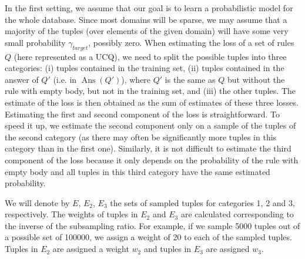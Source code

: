 \documentclass[akbc,twoside,11pt]{article}
\newcounter{example}
\newcommand{\ondrej}[1]{\textcolor{red}{O: {#1}}}
\begin{document}
In the first setting, we assume that our goal is to learn a probabilistic model for the whole database. Since most domains will be sparse, we may assume that a majority of the tuples (over elements of the given domain) will have some very small probability $\gamma_{\textit{target}}$, possibly zero. %
When estimating the loss of a set of rules $Q$ (here represented as a UCQ), we need to split the possible tuples into three categories: (i) tuples contained in the training set, (ii) tuples contained in the answer of $Q'$ (i.e. in $\operatorname{Ans}(Q')$), where $Q'$ is the same as $Q$ but without the rule with empty body, but not in the training set, and (iii) the other tuples. The estimate of the loss is then obtained as the sum of estimates of these three losses. Estimating the first and second component of the loss is straightforward. To speed it up, we estimate the second component only on a sample of the tuples of the second category (as there may often be significantly more tuples in this category than in the first one).
Similarly, it is not difficult to estimate the third component of the loss because it only depends on the probability of the rule with empty body and all tuples in this third category have the same estimated probability.

We will denote by $E$, $E_2$, $E_3$ the sets of sampled tuples for categories 1, 2 and 3, respectively.
The weights of tuples in $E_2$ and $E_3$ are calculated corresponding to the inverse of the subsampling ratio. For example, if we sample 5000 tuples out of a possible set of 100000, we assign a weight of 20 to each of the sampled tuples. Tuples in $E_2$ are assigned a weight $w_2$ and tuples in $E_3$ are assigned $w_3$. %
\end{document}
